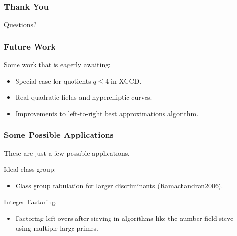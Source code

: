 \documentclass{beamer}
\begin{document}


\begin{frame}
\frametitle{Thank You}
Questions?
\end{frame}



\begin{frame}
\end{frame}
\begin{frame}
\end{frame}
\begin{frame}
\end{frame}

\begin{frame}
\frametitle{Future Work}
Some work that is eagerly awaiting:
\begin{itemize}
\item Special case for quotients $q \le 4$ in XGCD.
\item Real quadratic fields and hyperelliptic curves.
\item Improvements to left-to-right best approximations algorithm.
\end{itemize}
\end{frame}


\begin{frame}
\frametitle{Some Possible Applications}
These are just a few possible applications. \bigskip

Ideal class group:
\begin{itemize}
\item Class group tabulation for larger discriminants \break (Ramachandran2006).
\end{itemize}

\bigskip
Integer Factoring:
\begin{itemize}
\item Factoring left-overs after sieving in algorithms like the number field sieve using multiple large primes.
\end{itemize}

\end{frame}
\end{document}
